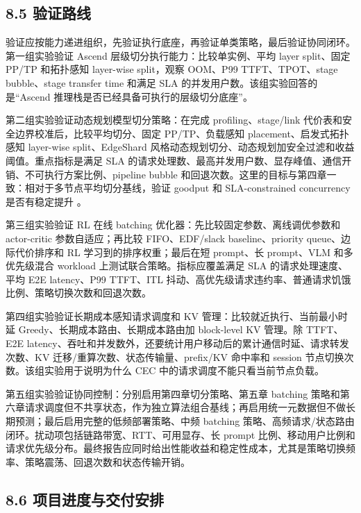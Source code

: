 \subsection*{8.5 验证路线}

验证应按能力递进组织，先验证执行底座，再验证单类策略，最后验证协同闭环。第一组实验验证 Ascend 层级切分执行能力：比较单实例、平均 layer split、固定 PP/TP 和拓扑感知 layer-wise split，观察 OOM、P99 TTFT、TPOT、stage bubble、stage transfer time 和满足 SLA 的并发用户数。该组实验回答的是“Ascend 推理栈是否已经具备可执行的层级切分底座”。

第二组实验验证动态规划模型切分策略：在完成 profiling、stage/link 代价表和安全边界校准后，比较平均切分、固定 PP/TP、负载感知 placement、启发式拓扑感知 layer-wise split、EdgeShard 风格动态规划切分、动态规划加安全过滤和收益阈值。重点指标是满足 SLA 的请求处理数、最高并发用户数、显存峰值、通信开销、不可执行方案比例、pipeline bubble 和回退次数。这里的目标与第四章一致：相对于多节点平均切分基线，验证 goodput 和 SLA-constrained concurrency 是否有稳定提升 \cite{huawei2026internal}。

第三组实验验证 RL 在线 batching 优化器：先比较固定参数、离线调优参数和 actor-critic 参数自适应；再比较 FIFO、EDF/slack baseline、priority queue、边际代价排序和 RL 学习到的排序权重；最后在短 prompt、长 prompt、VLM 和多优先级混合 workload 上测试联合策略。指标应覆盖满足 SLA 的请求处理速度、平均 E2E latency、P99 TTFT、ITL 抖动、高优先级请求违约率、普通请求饥饿比例、策略切换次数和回退次数。

第四组实验验证长期成本感知请求调度和 KV 管理：比较就近执行、当前最小时延 Greedy、长期成本路由、长期成本路由加 block-level KV 管理。除 TTFT、E2E latency、吞吐和并发数外，还要统计用户移动后的累计通信时延、请求转发次数、KV 迁移/重算次数、状态传输量、prefix/KV 命中率和 session 节点切换次数。该组实验用于说明为什么 CEC 中的请求调度不能只看当前节点负载。

第五组实验验证协同控制：分别启用第四章切分策略、第五章 batching 策略和第六章请求调度但不共享状态，作为独立算法组合基线；再启用统一元数据但不做长期预测；最后启用完整的低频部署策略、中频 batching 策略、高频请求/状态路由闭环。扰动项包括链路带宽、RTT、可用显存、长 prompt 比例、移动用户比例和请求优先级分布。最终报告应同时给出性能收益和稳定性成本，尤其是策略切换频率、策略震荡、回退次数和状态传输开销。

\subsection*{8.6 项目进度与交付安排}

